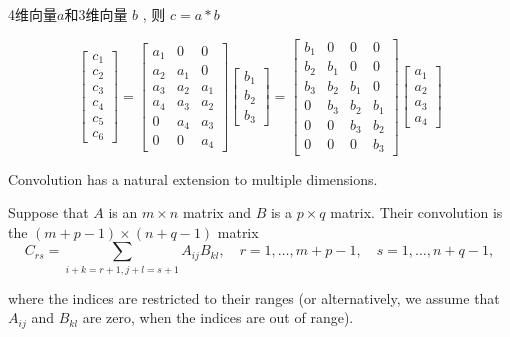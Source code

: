 \begin{example}
    4维向量$a$和3维向量 $ b $ ,  则 $ c=a * b $

\begin{equation}
\left[\begin{array}{l}
c_{1} \\
c_{2} \\
c_{3} \\
c_{4} \\
c_{5} \\
c_{6}
\end{array}\right]=\left[\begin{array}{lll}
a_{1} & 0 & 0 \\
a_{2} & a_{1} & 0 \\
a_{3} & a_{2} & a_{1} \\
a_{4} & a_{3} & a_{2} \\
0 & a_{4} & a_{3} \\
0 & 0 & a_{4}
\end{array}\right]\left[\begin{array}{l}
b_{1} \\
b_{2} \\
b_{3}
\end{array}\right]=\left[\begin{array}{cccc}
b_{1} & 0 & 0 & 0 \\
b_{2} & b_{1} & 0 & 0 \\
b_{3} & b_{2} & b_{1} & 0 \\
0 & b_{3} & b_{2} & b_{1} \\
0 & 0 & b_{3} & b_{2} \\
0 & 0 & 0 & b_{3}
\end{array}\right]\left[\begin{array}{l}
a_{1} \\
a_{2} \\
a_{3} \\
a_{4}
\end{array}\right]
\end{equation}
\end{example}

Convolution has a natural extension to multiple dimensions.

\begin{definition}[2-D convolution]
     Suppose that $ A $ is an $ m \times n $ matrix and $ B $ is a $ p \times q $ matrix. Their convolution is the $ (m+p-1) \times(n+q-1) $ matrix
\begin{equation}
C_{r s}=\sum_{i+k=r+1, j+l=s+1} A_{i j} B_{k l}, \quad r=1, \ldots, m+p-1, \quad s=1, \ldots, n+q-1,
\end{equation}

where the indices are restricted to their ranges (or alternatively, we assume that $ A_{i j} $ and $ B_{k l} $ are zero, when the indices are out of range). 
\end{definition}

